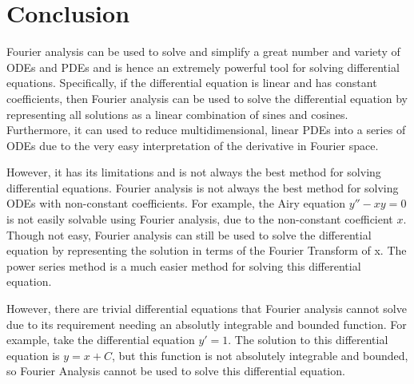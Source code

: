 \section{Conclusion}
\label{section:conclusion}
Fourier analysis can be used to solve and simplify a great number and variety of ODEs and PDEs and is hence an extremely powerful tool for solving differential equations.
Specifically, if the differential equation is linear and has constant coefficients, then Fourier analysis can be used to solve the differential equation by representing all solutions as a linear combination of sines and cosines.
Furthermore, it can used to reduce multidimensional, linear PDEs into a series of ODEs due to the very easy interpretation of the derivative in Fourier space.

However, it has its limitations and is not always the best method for solving differential equations.
Fourier analysis is not always the best method for solving ODEs with non-constant coefficients.
For example, the Airy equation $y'' - xy = 0$ is not easily solvable using Fourier analysis, due to the non-constant coefficient $x$.
Though not easy, Fourier analysis can still be used to solve the differential equation by representing the solution in terms of the Fourier Transform of x. 
The power series method is a much easier method for solving this differential equation.


However, there are trivial differential equations that Fourier analysis cannot solve due to its requirement needing an absolutly integrable and bounded function. 
For example, take the differential equation $y' = 1$. 
The solution to this differential equation is $y = x + C$, but this function is not absolutely integrable and bounded, so Fourier Analysis cannot be used to solve this differential equation.
